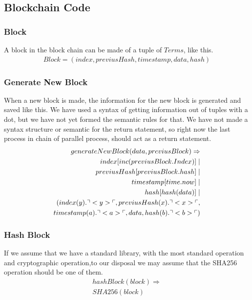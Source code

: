 \subsection{Blockchain Code}

\subsubsection{Block}
A block in the block chain can be made of a tuple of $Terms$, like this.
\begin{align*}
    Block = (index, previusHash, timestamp, data, hash)
\end{align*}

\subsubsection{Generate New Block}
When a new block is made, the information for the new block is generated and saved like this. We have used a syntax of getting information out of tuples with a dot, but we have not yet formed the semantic rules for that. We have not made a syntax structure or semantic for the return statement, so right now the last process in chain of parallel process, should act as a return statement.
\begin{align*}
    generateNewBlock(data, previusBlock)\Rightarrow \\
    index[inc(previusBlock.Index)]\mid\\
    previusHash[previusBlock.hash] \mid \\
    timestamp[time.now] \mid \\
    hash[hash(data)] \mid \\
    (index(y).\urcorner <y> \ulcorner, previusHash(x).\urcorner <x> \ulcorner,\\ timestamp(a).\urcorner <a> \ulcorner, data, hash(b).\urcorner <b> \ulcorner)
\end{align*}


\subsubsection{Hash Block}
If we assume that we have a standard library, with the most standard operation and cryptographic operation,to our disposal we may assume that the SHA256 operation should be one of them.
\begin{align*}
    hashBlock(block)\Rightarrow\\
    SHA256(block)\\
\end{align*}

